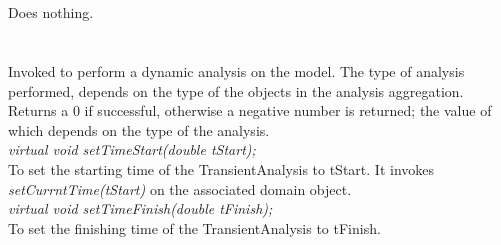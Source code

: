  \\
\\ 
Does nothing. \\

\\
 \\
Invoked to perform a dynamic analysis on the model. The type of analysis
performed, depends on the type of the objects in the analysis
aggregation. Returns a $0$ if successful, otherwise a negative number
is returned; the value of which depends on the type of the analysis. \\

{\em virtual void setTimeStart(double tStart);}\\
To set the starting time of the TransientAnalysis to \p tStart. It
invokes {\em setCurrntTime(tStart)} on the associated domain object.\\

{\em virtual void setTimeFinish(double tFinish);}\\
To set the finishing time of the TransientAnalysis to \p tFinish. \\

\\
